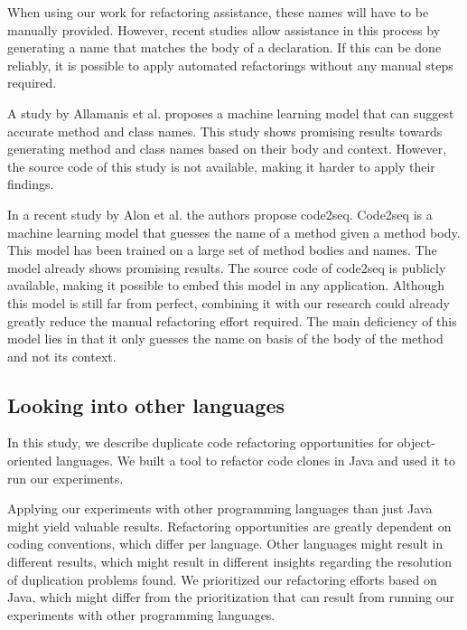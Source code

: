 When using our work for refactoring assistance, these names will have to be manually provided. However, recent studies allow assistance in this process by generating a name that matches the body of a declaration. If this can be done reliably, it is possible to apply automated refactorings without any manual steps required.

A study by Allamanis et al. \cite{allamanis2015suggesting} proposes a machine learning model that can suggest accurate method and class names. This study shows promising results towards generating method and class names based on their body and context. However, the source code of this study is not available, making it harder to apply their findings.

In a recent study by Alon et al. \cite{alon2018code2seq} the authors propose code2seq. Code2seq is a machine learning model that guesses the name of a method given a method body. This model has been trained on a large set of method bodies and names. The model already shows promising results. The source code of code2seq is publicly available, making it possible to embed this model in any application. Although this model is still far from perfect, combining it with our research could already greatly reduce the manual refactoring effort required. The main deficiency of this model lies in that it only guesses the name on basis of the body of the method and not its context. %

\subsection{Looking into other languages}
In this study, we describe duplicate code refactoring opportunities for object-oriented languages. We built a tool to refactor code clones in Java and used it to run our experiments.

Applying our experiments with other programming languages than just Java might yield valuable results. Refactoring opportunities are greatly dependent on coding conventions, which differ per language. Other languages might result in different results, which might result in different insights regarding the resolution of duplication problems found. We prioritized our refactoring efforts based on Java, which might differ from the prioritization that can result from running our experiments with other programming languages.

